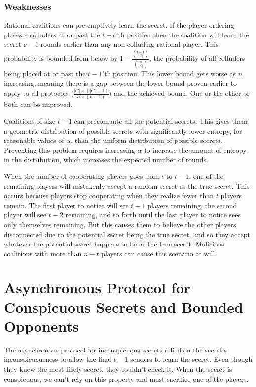 \documentclass{dalcsthesis}
\begin{document}
\subsection{Weaknesses}

Rational coalitions can pre-emptively learn the secret. If the player ordering places $c$ colluders at or past the $t-c$'th position then the coalition will learn the secret $c-1$ rounds earlier than any non-colluding rational player. This probability is bounded from below by $1 - \frac{{t - 1 \choose |C|}}{{n \choose |C|}}$, the probability of all colluders being placed at or past the $t-1$'th position. This lower bound gets worse as $n$ increasing, meaning there is a gap between the lower bound proven earlier to apply to all protocols ($\frac{|C| \times (|C|-1)}{n \times (n-1)}$) and the achieved bound. One or the other or both can be improved.

Coalitions of size $t-1$ can precompute all the potential secrets. This gives them a geometric distribution of possible secrets with significantly lower entropy, for reasonable values of $\alpha$, than the uniform distribution of possible secrets. Preventing this problem requires increasing $\alpha$ to increase the amount of entropy in the distribution, which increases the expected number of rounds.

When the number of cooperating players goes from $t$ to $t-1$, one of the remaining players will mistakenly accept a random secret as the true secret. This occurs because players stop cooperating when they realize fewer than $t$ players remain. The first player to notice will see $t-1$ players remaining, the second player will see $t-2$ remaining, and so forth until the last player to notice sees only themselves remaining. But this causes them to believe the other players disconnected due to the potential secret being the true secret, and so they accept whatever the potential secret happens to be as the true secret. Malicious coalitions with more than $n-t$ players can cause this scenario at will.

\chapter{Asynchronous Protocol for Conspicuous Secrets and Bounded Opponents}

The asynchronous protocol for inconspicuous secrets relied on the secret's inconspicuousness to allow the final $t-1$ senders to learn the secret. Even though they knew the most likely secret, they couldn't check it. When the secret is conspicuous, we can't rely on this property and must sacrifice one of the players.
\end{document}
